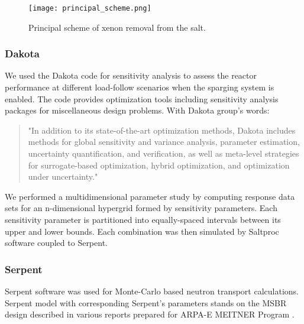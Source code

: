     \begin{figure}[h]
        \begin{center}
            \texttt{[image: principal\_scheme.png]}
        \end{center}
        \caption{Principal scheme of xenon removal from the salt.}
        \label{fig:scheme}
    \end{figure}

\subsubsection{Dakota}

    We used the Dakota code \cite{adams_dakota_2019} for sensitivity analysis 
    to assess the reactor performance at different load-follow scenarios when 
    the sparging system is enabled. The code provides optimization tools 
    including sensitivity analysis packages for miscellaneous design problems. 
    With Dakota group's words:

    \begin{quote}
        "In addition to its state-of-the-art optimization methods, Dakota
        includes methods for global sensitivity and variance analysis, 
            parameter
        estimation, uncertainty quantification, and verification, as well as
        meta-level strategies for surrogate-based optimization, hybrid
        optimization, and optimization under uncertainty."
    \end{quote}

    We performed a multidimensional parameter study by computing response data 
    sets for an n-dimensional hypergrid formed by sensitivity parameters. Each 
    sensitivity parameter is partitioned into equally-spaced intervals between 
    its upper and lower bounds. Each combination was then simulated by Saltproc 
    software coupled to Serpent.

\subsubsection{Serpent}

    Serpent software \cite{Lep2014} was used for Monte-Carlo based neutron 
    transport calculations. Serpent model with corresponding Serpent's 
    parameters stands on the MSBR design described in various reports prepared 
    for ARPA-E MEITNER Program \cite{rykhlevskii_fuel_2019, 
    rykhlevskii_modeling_2019, rykhlevskii_fuel_2020}.

\newpage
\FloatBarrier

